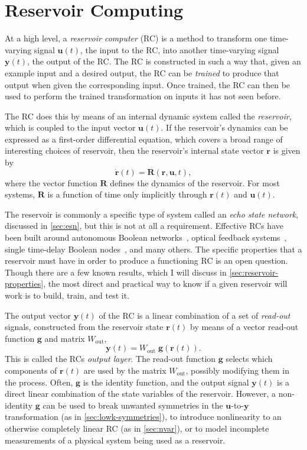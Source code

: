 \chapter{Reservoir Computing}\label{ch:reservoir-computing}

At a high level, a \emph{reservoir computer} (RC) is a method to
transform one time-varying signal $\bm{u}(t)$, the input to the RC,
into another time-varying signal $\bm{y}(t)$, the output of the
RC. The RC is constructed in such a way that, given an example input
and a desired output, the RC can be \emph{trained} to produce that
output when given the corresponding input. Once trained, the RC can
then be used to perform the trained transformation on inputs it has
not seen before.

The RC does this by means of an internal dynamic system called the
\emph{reservoir}, which is coupled to the input vector $\bm{u}(t)$. If the
reservoir's dynamics can be expressed as a first-order differential
equation, which covers a broad range of interesting choices of
reservoir, then the reservoir's internal state vector $\bm{r}$ is given by
\begin{equation}
  \label{eq:reservoir}
  \dot{\mathbf{r}}(t) = \mathbf{R}\left(\mathbf{r}, \mathbf{u}, t\right),
\end{equation}
where the vector function $\mathbf{R}$ defines the dynamics of the reservoir. For most systems, $\mathbf{R}$ is a function of time only implicitly through $\bm{r}(t)$ and $\bm{u}(t)$.

The reservoir is commonly a specific type of system called an
\emph{echo state network}, discussed in \cref{sec:esn}, but this is
not at all a requirement. Effective RCs have been built around
autonomous Boolean networks~\cite{canaday2018}, optical feedback
systems~\cite{antonik2016}, single time-delay Boolean
nodes~\cite{haynes2015}, and many others. The specific properties that
a reservoir must have in order to produce a functioning RC is an open
question. Though there are a few known results, which I will discuss
in \cref{sec:reservoir-properties}, the most direct and practical way
to know if a given reservoir will work is to build, train, and test
it.

The output vector $\bm{y}(t)$ of the RC is a linear
combination of a set of \emph{read-out} signals, constructed from the
reservoir state $\bm{r}(t)$ by means of a vector read-out function $\bm{g}$ and matrix $W_\text{out}$,
\begin{equation}
  \label{eq:output}
  \bm{y}(t) = W_\text{out}\;\bm{g}\left(\bm{r}(t)\right).
\end{equation}
This is called the RCs \emph{output layer}. The read-out function $\bm{g}$
selects which components of $\bm{r}(t)$ are used by the matrix $W_\text{out}$,
possibly modifying them in the process.
Often, $\bm{g}$ is the
identity function, and the output signal $\bm{y}(t)$ is a direct
linear combination of the state variables of the reservoir. However, a
non-identity $\bm{g}$ can be used to break unwanted symmetries in the
$\bm{u}$-to-$\bm{y}$ transformation (as in \cref{sec:lowk-symmetries}), to introduce nonlinearity to an
otherwise completely linear RC (as in \cref{sec:nvar}), or to model incomplete measurements of
a physical system being used as a reservoir.

